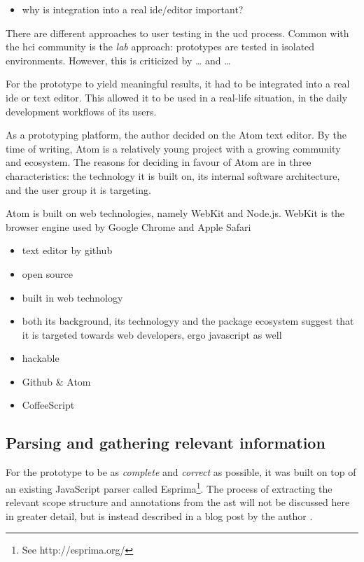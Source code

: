 \begin{itemize}
\itemsep1pt\parskip0pt
\item
  why is integration into a real ide/editor important?
\end{itemize}

There are different approaches to user testing in the \ac{ucd} process.
Common with the \ac{hci} community is the \emph{lab} approach:
prototypes are tested in isolated environments. However, this is
criticized by \ldots{} and \ldots{}

For the prototype to yield meaningful results, it had to be integrated
into a real \ac{ide} or text editor. This allowed it to be used in a
real-life situation, in the daily development workflows of its users.

As a prototyping platform, the author decided on the Atom text editor.
By the time of writing, Atom is a relatively young project with a
growing community and ecosystem. The reasons for deciding in favour of
Atom are in three characteristics: the technology it is built on, its
internal software architecture, and the user group it is targeting.

Atom is built on web technologies, namely WebKit and Node.js. WebKit is
the browser engine used by Google Chrome and Apple Safari

\begin{itemize}
\item
  text editor by github
\item
  open source
\item
  built in web technology
\item
  both its background, its technologyy and the package ecosystem suggest
  that it is targeted towards web developers, ergo javascript as well
\item
  hackable
\item
  Github \& Atom
\item
  CoffeeScript
\end{itemize}

\subsection{Parsing and gathering relevant
information}\label{parsing-and-gathering-relevant-information}

For the prototype to be as \emph{complete} and \emph{correct} as
possible, it was built on top of an existing JavaScript parser called
Esprima\footnote{See http://esprima.org/}. The process of extracting the
relevant scope structure and annotations from the \ac{ast} will not be
discussed here in greater detail, but is instead described in a blog
post by the author \cite{tvo}.

